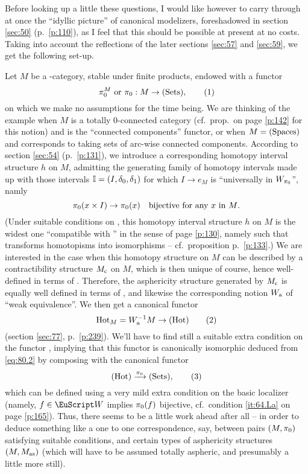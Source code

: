 Before looking up a little these questions, I would like however to
carry through at once the ``idyllic picture'' of canonical modelizers,
foreshadowed in section \ref{sec:50} (p.\ \ref{p:110}), as I feel that
this should be possible at present at no costs. Taking into account
the reflections of the later sections \ref{sec:57} and \ref{sec:59},
we get the following set-up.

Let $M$ be a \scrU-category, stable under finite products, endowed
with a functor
\begin{equation}
  \label{eq:80.1}
  \pi_0^M\text{ or }{\ensuremath{\pi_0}}: M\to{\ensuremath{(\mathrm{Sets})}},\tag{1}
\end{equation}
on which we make no assumptions for the time being. We are thinking of
the example when $M$ is a totally $0$-connected category (cf.\ prop.\
on page \ref{p:142} for this notion) and \piz{} is the ``connected
components'' functor, or when $M={(\mathrm{Spaces})}$ and \piz{} corresponds to
taking sets of arc-wise connected components. According to section
\ref{sec:54} (p.\ \ref{p:131}), we introduce a corresponding homotopy
interval structure $h$ on $M$, admitting the generating family of
homotopy intervals made up with those intervals
${\mathbb{I}}=(I,\delta_0,\delta_1)$ for which $I\to e_M$ is ``universally in
$W_{\pi_0}$'', namly
\[{\pi_0}(x\times I)\to{\ensuremath{\pi_0}}(x) \quad\text{bijective for any $x$ in
  $M$.}\]
(Under suitable conditions on \piz, this homotopy interval structure
$h$ on $M$ is the widest one ``compatible with \piz'' in the sense of
page \ref{p:130}, namely such that \piz{} transforms homotopisms into
isomorphisms -- cf.\ proposition p.\ \ref{p:133}.) We are interested
in the case when this homotopy structure on $M$ can be described by a
contractibility structure $M_{\mathrm{c}}$ on $M$, which is then unique of
course, hence well-defined in terms of \piz. Therefore, the
asphericity structure generated by $M_{\mathrm{c}}$ is equally well defined in
terms of \piz, and likewise the corresponding notion $W_{\mathrm{a}}$ of
``weak equivalence''. We then get a canonical functor
\begin{equation}
  \label{eq:80.2}
  \operatorname{Hot}_M = W_{\mathrm{a}}^{-1}M \to {\ensuremath{(\mathrm{Hot})}}\tag{2}
\end{equation}
(section \ref{sec:77}, p.\ \ref{p:239}). We'll have to find still a
suitable extra condition on the functor \piz, implying that this
functor is canonically isomorphic deduced from \eqref{eq:80.2} by
composing with the canonical functor\pspage{258}
\begin{equation}
  \label{eq:80.3}
  {\ensuremath{(\mathrm{Hot})}} \xrightarrow{{\pi_0}} {(\mathrm{Sets})},
  \tag{3}
\end{equation}
which can be defined using a very mild extra condition on the basic
localizer \scrW{} (namely, $f\in\scrW$ implies ${\pi_0}(f)$ bijective,
cf.\ condition \ref{it:64.La} on page \ref{p:165}). Thus, there seems
to be a little work ahead after all -- in order to deduce something
like a one to one correspondence, say, between pairs $(M,{\pi_0})$
satisfying suitable conditions, and certain types of asphericity
structures $(M,M_{\mathrm{as}})$ (which will have to be assumed totally
aspheric, and presumably a little more still).


